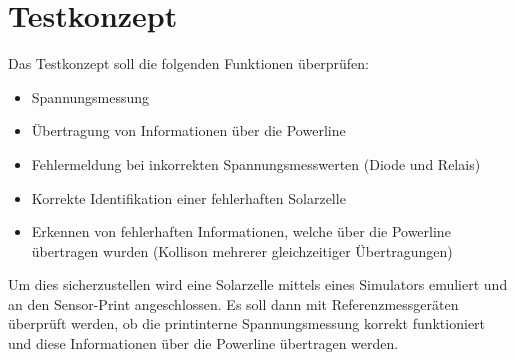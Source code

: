 %
%
%
\section{Testkonzept}

Das Testkonzept soll die folgenden Funktionen überprüfen:
\begin{itemize}
	\item Spannungsmessung
	\item Übertragung von Informationen über die Powerline
	\item Fehlermeldung bei inkorrekten Spannungsmesswerten (Diode und Relais)
	\item Korrekte Identifikation einer fehlerhaften Solarzelle
	\item Erkennen von fehlerhaften Informationen, welche über die Powerline übertragen wurden (Kollison mehrerer gleichzeitiger Übertragungen)
\end{itemize}

Um dies sicherzustellen wird eine Solarzelle mittels eines Simulators emuliert und an den Sensor-Print angeschlossen. Es soll dann mit Referenzmessgeräten überprüft werden, ob die printinterne Spannungsmessung korrekt funktioniert und diese Informationen über die Powerline übertragen werden.
%